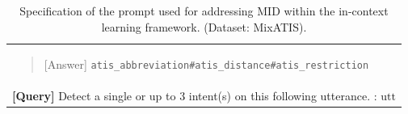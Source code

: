 \begin{table}
\begin{tabular}{>{\raggedright\arraybackslash}p{15cm}}
\begin{quote}
            {[Answer]} \texttt{atis\_abbreviation\#atis\_distance\#atis\_restriction} 
            \end{quote}
            \\
            \arrayrulecolor{lightgray}\midrule\arrayrulecolor{black}
        
        \textbf{[Query]} Detect a single or up to 3 intent(s) on this following utterance. : $\mathrm{utt}$ \\
        
        \bottomrule
    \end{tabular}
    
    \caption{Specification of the prompt used for addressing MID within the in-context learning framework. (Dataset: MixATIS).}
    \centering
    \label{table:appendix_chatgpt_prompt}
\end{table}